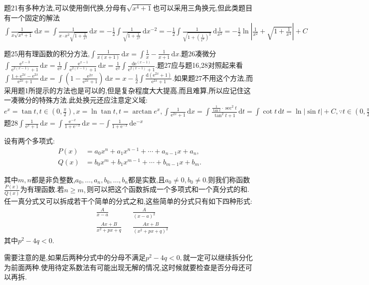 题21有多种方法,可以使用倒代换,分母有$\sqrt{x^4+1}$也可以采用三角换元,但此类题目有一个固定的解法$\int \frac{1}{x\sqrt{x^4+1}} \,\mathrm{d}x =\int \frac{1}{x\cdot x^2\sqrt{1+\frac{1}{x^4}}} \,\mathrm{d}x =-\frac{1}{2}\int \frac{1}{\sqrt{1+\frac{1}{x^4}}} \,\mathrm{d}x^{-2} =-\frac{1}{2}\int \frac{1}{\sqrt{1+(\frac{1}{x^2})^2}} \,\mathrm{d}\frac{1}{x^2} =-\frac{1}{2}\ln \left\lvert \frac{1}{x^2}+\sqrt{1+\frac{1}{x^4}}\right\rvert+C$

题25用有理函数的积分方法,$\int \frac{1}{x(x+1)} \,\mathrm{d}x =\int \frac{1}{x}-\frac{1}{x+1} \,\mathrm{d}x .$题26凑微分$\int \frac{\mathrm{e}^{x-3}}{\mathrm{e}^{2(x-1)}+1} \,\mathrm{d}x =\frac{1}{\mathrm{e}^2}\int \frac{\mathrm{e}^{x-1}}{\mathrm{e}^{2(x-1)}+1} \,\mathrm{d}x =\frac{1}{\mathrm{e}^2}\int \frac{\mathrm{d}\mathrm{e}^{(x-1)}}{\mathrm{e}^{2(x-1)}+1} .$题27应与题16,28对照起来看$\int \frac{1+\mathrm{e}^{2x}-\mathrm{e}^{2x}}{\mathrm{e}^{2x}+1} \,\mathrm{d}x =\int \left(1-\frac{\mathrm{e}^{2x}}{\mathrm{e}^{2x}+1}\right)  \,\mathrm{d}x =x-\frac{1}{2}\int \frac{\mathrm{d}(\mathrm{e}^{2x}+1)}{\mathrm{e}^{2x}+1} .$如果题27不用这个方法,而采用题1所提示的方法也是可以的,但是复杂程度大大提高,而且难算,所以应记住这一凑微分的特殊方法.此处换元还应注意定义域:$e^x=\tan t,t \in (0,\frac{\pi}{2}),x=\ln \tan t,t=\arctan e^x,\int \frac{1}{\mathrm{e}^{2x}+1} \,\mathrm{d}x =\int \frac{\frac{1}{\tan t}\cdot\sec ^2t}{\tan ^2t+1} \,\mathrm{d}t =\int \cot t \,\mathrm{d}t =\ln \left\lvert \sin t\right\rvert +C,\because t \in (0,\frac{\pi}{2})\therefore \sin t=\frac{\mathrm{e}^x}{\sqrt{\mathrm{e}^{2x}+1}}>0 \therefore \ln \left\lvert \sin t\right\rvert +C=\frac{1}{2}\ln \frac{\mathrm{e}^{2x}}{\mathrm{e}^{2x}+1}+C=\frac{1}{2}\left( \ln \mathrm{e}^{2x}-\ln (\mathrm{e}^{2x}+1) \right)+C=\frac{1}{2}\left( 2x-\ln (\mathrm{e}^{2x}+1) \right)+C.$题28$\int \frac{1}{\mathrm{e} ^x+1} \,\mathrm{d}x=\int \frac{\mathrm{e} ^{-x}}{1+\mathrm{e} ^{-x}} \,\mathrm{d}x =-\int \frac{1}{1+\mathrm{e} ^{-x}} \,\mathrm{d}\mathrm{e} ^{-x} $

\begin{definition}[有理函数]
设有两个多项式:
    \begin{align*}
        P(x)&=a_0x^n+a_1x^{n-1}+\cdots+a_{n-1}x+a_n,\\
        Q(x)&=b_0x^m+b_1x^{m-1}+\cdots+b_{m-1}x+b_m.
    \end{align*}

其中$m,n$都是非负整数,$a_0,\dots,a_n,b_0,\dots,b_n$都是实数,且$a_0\neq 0,b_0\neq 0.$则我们称函数$\frac{P(x)}{Q(x)}$为有理函数.若$n\geqslant m,$则可以把这个函数拆成一个多项式和一个真分式的和.任一真分式又可以拆成若干个简单的分式之和,这些简单的分式只有如下四种形式:
    \begin{align*}
        &\frac{A}{x-a}&
        &\frac{A}{(x-a)^2}\\
        &\frac{Ax+B}{x^2+px+q}&
        &\frac{Ax+B}{(x^2+px+q)^2}
    \end{align*}
其中$p^2-4q<0.$
\end{definition}
需要注意的是,如果后两种分式中的分母不满足$p^2-4q<0,$就一定可以继续拆分化为前面两种.使用待定系数法有可能出现无解的情况,这时候就要检查是否分母还可以再拆.

